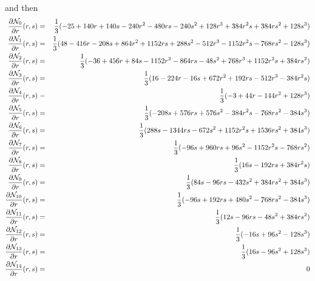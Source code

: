 and then
\begin{eqnarray}
\frac{\partial{\mathcal{N}}_0}{\partial r} (r,s) &=& 
\frac13 ( -25+140r+140s -240r^2-480rs-240s^2+128r^3+384 r^2s + 384 rs^2 + 128 s^3 ) \nonumber\\
\frac{\partial{\mathcal{N}}_1}{\partial r} (r,s) &=& \frac13 ( 48 -416r-208s +864r^2+1152rs+288s^2-512r^3-1152r^2s-768rs^2-128s^3)\nonumber\\
\frac{\partial{\mathcal{N}}_2}{\partial r} (r,s) &=& \frac13(-36+456r+84s-1152r^2-864rs-48s^2+768r^3+1152r^2s+384rs^2)\nonumber\\
\frac{\partial{\mathcal{N}}_3}{\partial r} (r,s) &=& \frac13(16-224r-16s+672r^2+192rs-512r^3-384r^2s)\nonumber\\
\frac{\partial{\mathcal{N}}_4}{\partial r} (r,s) &=& \frac13(-3+44r-144r^2+128r^3)\nonumber\\
\frac{\partial{\mathcal{N}}_5}{\partial r} (r,s) &=& \frac13(-208s+576rs+576s^2-384r^2s-768rs^2-384s^3)\nonumber\\
\frac{\partial{\mathcal{N}}_6}{\partial r} (r,s) &=& \frac13(288s-1344rs-672s^2+1152r^2s+1536rs^2+384s^3)\nonumber\\
\frac{\partial{\mathcal{N}}_7}{\partial r} (r,s) &=& \frac13(-96s+960rs+96s^2-1152r^2s-768rs^2)\nonumber\\
\frac{\partial{\mathcal{N}}_8}{\partial r} (r,s) &=& \frac13(16s-192rs+384r^2s)\nonumber\\
\frac{\partial{\mathcal{N}}_9}{\partial r} (r,s) &=& \frac13(84s-96rs-432s^2+384rs^2+384s^3)\nonumber\\
\frac{\partial{\mathcal{N}}_{10}}{\partial r} (r,s) &=& \frac13(-96s+192rs+480s^2-768rs^2-384s^3)\nonumber\\
\frac{\partial{\mathcal{N}}_{11}}{\partial r} (r,s) &=& \frac13(12s-96rs-48s^2+384rs^2)\nonumber\\
\frac{\partial{\mathcal{N}}_{12}}{\partial r} (r,s) &=& \frac13(-16s+96s^2-128s^3)\nonumber\\
\frac{\partial{\mathcal{N}}_{13}}{\partial r} (r,s) &=& \frac13(16s-96s^2+128s^3)\nonumber\\
\frac{\partial{\mathcal{N}}_{14}}{\partial r} (r,s) &=& 0\nonumber
\end{eqnarray}

